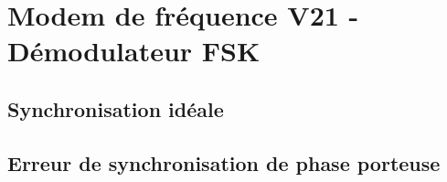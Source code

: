 \section{Modem de fréquence V21 - Démodulateur FSK}

\subsection{Synchronisation idéale}


\subsection{Erreur de synchronisation de phase porteuse}

